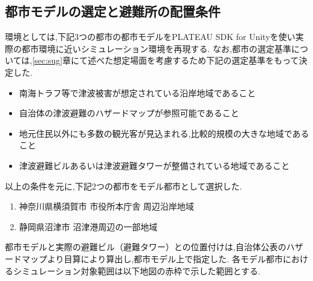 \subsection{都市モデルの選定と避難所の配置条件}
環境としては,下記3つの都市の都市モデルをPLATEAU SDK for Unityを使い実際の都市環境に近いシミュレーション環境を再現する.
なお,都市の選定基準については,\ref{sec:sug}章にて述べた想定場面を考慮するため下記の選定基準をもって決定した.
\begin{itemize}
  \item 南海トラフ等で津波被害が想定されている沿岸地域であること
  \item 自治体の津波避難のハザードマップが参照可能であること
  \item 地元住民以外にも多数の観光客が見込まれる,比較的規模の大きな地域であること
  \item 津波避難ビルあるいは津波避難タワーが整備されている地域であること
\end{itemize}
以上の条件を元に,下記2つの都市をモデル都市として選択した.
\begin{enumerate}
  \item 神奈川県横須賀市 市役所本庁舎 周辺沿岸地域
  \item 静岡県沼津市 沼津港周辺の一部地域
\end{enumerate}
都市モデルと実際の避難ビル（避難タワー）との位置付けは,自治体公表のハザードマップより目算により算出し,都市モデル上で指定した.
各モデル都市におけるシミュレーション対象範囲は以下地図の赤枠で示した範囲とする.
